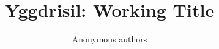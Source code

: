 \documentclass{article}
\title{Yggdrisil: Working Title}
\author{Anonymous authors}
\begin{document}
\maketitle

\begin{abstract}

\end{abstract}










% 
% 

\clearpage
\appendix

\end{document}
